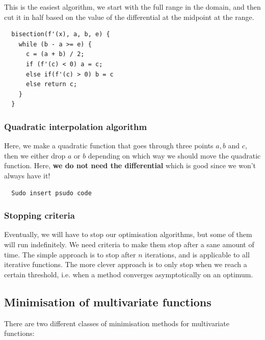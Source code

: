 This is the easiest algorithm, we start with the full range in the domain, and
then cut it in half based on the value of the differential at the midpoint at
the range.

\begin{verbatim}
  bisection(f'(x), a, b, e) {
    while (b - a >= e) {
      c = (a + b) / 2;
      if (f'(c) < 0) a = c;
      else if(f'(c) > 0) b = c
      else return c;
    }
  }
\end{verbatim}

\subsubsection{Quadratic interpolation algorithm}

Here, we make a quadratic function that goes through three points $a, b$ and
$c$, then we either drop $a$ or $b$ depending on which way we should move the
quadratic function. Here, \textbf{we do not need the differential} which is good
since we won't always have it!


\begin{verbatim}
  Sudo insert psudo code
\end{verbatim}

\subsubsection{Stopping criteria}

Eventually, we will have to stop our optimisation algorithms, but some of them
will run indefinitely. We need criteria to make them stop after a sane amount of
time. The simple approach is to stop after $n$ iterations, and is applicable to
all iterative functions. The more clever approach is to only stop when we reach
a certain threshold, i.e. when a method converges asymptotically on an optimum.

\subsection{Minimisation of multivariate functions}

There are two different classes of minimisation methods for multivariate
functions:

